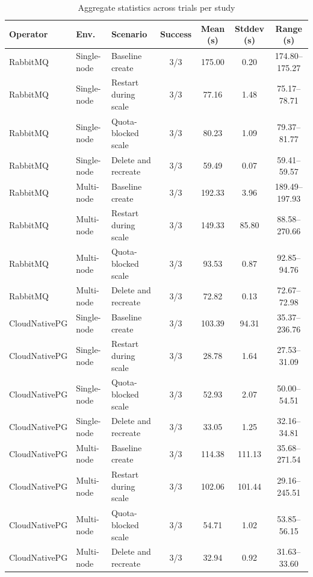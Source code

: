 \documentclass[sigconf,screen]{acmart}
\begin{document}
\begin{table}[t]
\centering
\scriptsize
\caption{Aggregate statistics across \RUPTrialCount{} trials per study}
\label{tab:detailed-results}
\begin{tabularx}{\textwidth}{llYcccc}
\toprule
\textbf{Operator} & \textbf{Env.} & \textbf{Scenario} & \textbf{Success} & \textbf{Mean (s)} & \textbf{Stddev (s)} & \textbf{Range (s)} \\
\midrule
RabbitMQ & Single-node & Baseline create & 3/3 & 175.00 & 0.20 & 174.80--175.27 \\
RabbitMQ & Single-node & Restart during scale & 3/3 & 77.16 & 1.48 & 75.17--78.71 \\
RabbitMQ & Single-node & Quota-blocked scale & 3/3 & 80.23 & 1.09 & 79.37--81.77 \\
RabbitMQ & Single-node & Delete and recreate & 3/3 & 59.49 & 0.07 & 59.41--59.57 \\
RabbitMQ & Multi-node & Baseline create & 3/3 & 192.33 & 3.96 & 189.49--197.93 \\
RabbitMQ & Multi-node & Restart during scale & 3/3 & 149.33 & 85.80 & 88.58--270.66 \\
RabbitMQ & Multi-node & Quota-blocked scale & 3/3 & 93.53 & 0.87 & 92.85--94.76 \\
RabbitMQ & Multi-node & Delete and recreate & 3/3 & 72.82 & 0.13 & 72.67--72.98 \\
CloudNativePG & Single-node & Baseline create & 3/3 & 103.39 & 94.31 & 35.37--236.76 \\
CloudNativePG & Single-node & Restart during scale & 3/3 & 28.78 & 1.64 & 27.53--31.09 \\
CloudNativePG & Single-node & Quota-blocked scale & 3/3 & 52.93 & 2.07 & 50.00--54.51 \\
CloudNativePG & Single-node & Delete and recreate & 3/3 & 33.05 & 1.25 & 32.16--34.81 \\
CloudNativePG & Multi-node & Baseline create & 3/3 & 114.38 & 111.13 & 35.68--271.54 \\
CloudNativePG & Multi-node & Restart during scale & 3/3 & 102.06 & 101.44 & 29.16--245.51 \\
CloudNativePG & Multi-node & Quota-blocked scale & 3/3 & 54.71 & 1.02 & 53.85--56.15 \\
CloudNativePG & Multi-node & Delete and recreate & 3/3 & 32.94 & 0.92 & 31.63--33.60 \\
\bottomrule
\end{tabularx}
\end{table}
\end{document}
